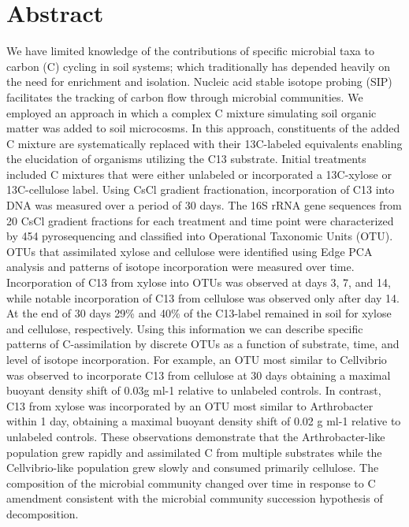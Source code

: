\section{Abstract} 
We have limited knowledge of the contributions of specific microbial taxa to carbon (C) cycling in soil systems; which traditionally has depended heavily on the need for enrichment and isolation. Nucleic acid stable isotope probing (SIP) facilitates the tracking of carbon flow through microbial communities. We employed an approach in which a complex C mixture simulating soil organic matter was added to soil microcosms. In this approach, constituents of the added C mixture are systematically replaced with their 13C-labeled equivalents enabling the elucidation of organisms utilizing the C13 substrate. Initial treatments included C mixtures that were either unlabeled or incorporated a 13C-xylose or 13C-cellulose label.  Using CsCl gradient fractionation, incorporation of C13 into DNA was measured over a period of 30 days. The 16S rRNA gene sequences from 20 CsCl gradient fractions for each treatment and time point were characterized by 454 pyrosequencing and classified into Operational Taxonomic Units (OTU).  OTUs that assimilated xylose and cellulose were identified using Edge PCA analysis and patterns of isotope incorporation were measured over time. Incorporation of C13 from xylose into OTUs was observed at days 3, 7, and 14, while notable incorporation of C13 from cellulose was observed only after day 14. At the end of 30 days 29\% and 40\% of the C13-label remained in soil for xylose and cellulose, respectively.  Using this information we can describe specific patterns of C-assimilation by discrete OTUs as a function of substrate, time, and level of isotope incorporation. For example, an OTU most similar to Cellvibrio was observed to incorporate C13 from cellulose at 30 days obtaining a maximal buoyant density shift of 0.03g ml-1 relative to unlabeled controls. In contrast, C13 from xylose was incorporated by an OTU most similar to Arthrobacter within 1 day, obtaining a maximal buoyant density shift of 0.02 g ml-1 relative to unlabeled controls.  These observations demonstrate that the Arthrobacter-like population grew rapidly and assimilated C from multiple substrates while the Cellvibrio-like population grew slowly and consumed primarily cellulose.  The composition of the microbial community changed over time in response to C amendment consistent with the microbial community succession hypothesis of decomposition. 